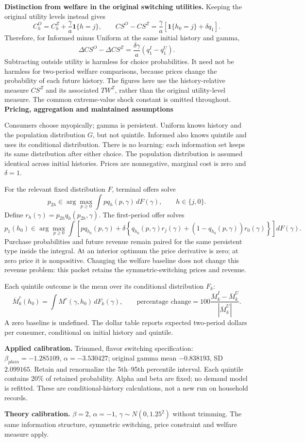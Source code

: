 \documentclass[11pt]{article}
\newcommand{\titleline}[1]{{\Large\bfseries #1}\par\vspace{3pt}}
\begin{document}
\textbf{Distinction from welfare in the original switching utilities.}
Keeping the original utility levels instead gives
\[
C_h^O=C_h^Z+\frac{\gamma}{a}\mathbf1\{h=j\},\qquad
CS^O-CS^Z=\frac{\gamma}{a}\left[\mathbf1\{h_0=j\}+\delta q_1\right].
\]
Therefore, for Informed minus Uniform at the same initial history and gamma,
\[
\Delta CS^O-\Delta CS^Z=\frac{\delta\gamma}{a}(q_1^I-q_1^U).
\]
Subtracting outside utility is harmless for choice probabilities. It need not be
harmless for two-period welfare comparisons, because prices change the probability
of each future history. The figures here use the history-relative measure $CS^Z$
and its associated $TW^Z$, rather than the original utility-level measure.
The common extreme-value shock constant is omitted throughout.
\newpage
\titleline{Pricing, aggregation and maintained assumptions}
\small
Consumers choose myopically; gamma is persistent. Uniform knows history and the
population distribution $G$, but not quintile. Informed also knows quintile and uses
its conditional distribution. There is no learning: each information set keeps its
same distribution after either choice. The population distribution is assumed identical
across initial histories. Prices are nonnegative, marginal cost is zero and $\delta=1$.

For the relevant fixed distribution $F$, terminal offers solve
\[
p_{2h}\in\arg\max_{p\geq0}\int p q_h(p,\gamma)\,dF(\gamma),\qquad h\in\{j,0\}.
\]
Define $r_h(\gamma)=p_{2h}q_h(p_{2h},\gamma)$. The first-period offer solves
\[
p_1(h_0)\in\arg\max_{p\geq0}\int\left[
 p q_{h_0}(p,\gamma)+\delta\left\{
 q_{h_0}(p,\gamma)r_j(\gamma)
 +(1-q_{h_0}(p,\gamma))r_0(\gamma)\right\}\right]dF(\gamma).
\]
Purchase probabilities and future revenue remain paired for the same persistent type
inside the integral. At an interior optimum the price derivative is zero; at zero price
it is nonpositive. Changing the welfare baseline does not change this revenue problem:
this packet retains the symmetric-switching prices and revenue.

Each quintile outcome is the mean over its conditional distribution $F_k$:
\[
\overline M_k^r(h_0)=\int M^r(\gamma,h_0)\,dF_k(\gamma),\qquad
\text{percentage change}=100\frac{\overline M_k^I-\overline M_k^U}{|\overline M_k^U|}.
\]
A zero baseline is undefined. The dollar table reports expected two-period dollars
per consumer, conditional on initial history and quintile.

\textbf{Applied calibration.}
Trimmed, flavor switching specification: $\beta_{plain}=-1.285109$, $\alpha=-3.530427$;
original gamma mean $-0.838193$, SD $2.099165$. Retain and renormalize the 5th--95th
percentile interval. Each quintile contains 20\% of retained probability. Alpha and beta
are fixed; no demand model is refitted. These are conditional-history calculations,
not a new run on household records.

\textbf{Theory calibration.}
$\beta=2$, $\alpha=-1$, $\gamma\sim N(0,1.25^2)$ without trimming.
The same information structure, symmetric switching, price constraint and welfare measure apply.
\end{document}
